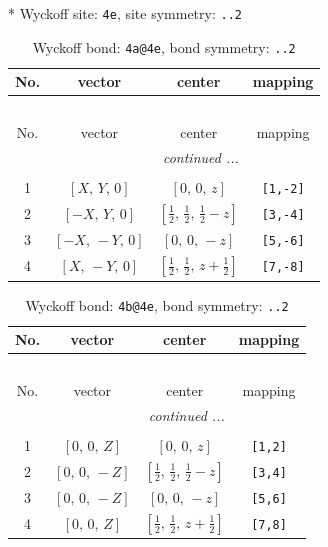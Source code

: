\documentclass[fleqn,8pt]{jsarticle}
\begin{document}
* Wyckoff site: {\tt 4e}, site symmetry: {\tt ..2}
\renewcommand{\arraystretch}{1.2}
\begin{longtable}{cccc}
\caption{Wyckoff bond: {\tt 4a@4e}, bond symmetry: {\tt ..2}}
 \\
 \hline \hline
No. & vector & center & mapping \\ \hline \endfirsthead

\multicolumn{3}{l}{\tablename\ \thetable{}} \\
 \hline \hline
No. & vector & center & mapping \\ \hline \endhead

 \hline \hline
\multicolumn{3}{r}{\footnotesize\it continued ...} \\ \endfoot

 \hline \hline
\multicolumn{3}{r}{} \\ \endlastfoot

1 & $\left[ X,\, Y,\, 0 \right]$ & $\left[ 0,\, 0,\, z \right]$ & {\tt [1,-2]} \\ \hline
2 & $\left[ - X,\, Y,\, 0 \right]$ & $\left[ \frac{1}{2},\, \frac{1}{2},\, \frac{1}{2} - z \right]$ & {\tt [3,-4]} \\ \hline
3 & $\left[ - X,\, - Y,\, 0 \right]$ & $\left[ 0,\, 0,\, - z \right]$ & {\tt [5,-6]} \\ \hline
4 & $\left[ X,\, - Y,\, 0 \right]$ & $\left[ \frac{1}{2},\, \frac{1}{2},\, z + \frac{1}{2} \right]$ & {\tt [7,-8]} \\
\end{longtable}
\renewcommand{\arraystretch}{1.2}
\begin{longtable}{cccc}
\caption{Wyckoff bond: {\tt 4b@4e}, bond symmetry: {\tt ..2}}
 \\
 \hline \hline
No. & vector & center & mapping \\ \hline \endfirsthead

\multicolumn{3}{l}{\tablename\ \thetable{}} \\
 \hline \hline
No. & vector & center & mapping \\ \hline \endhead

 \hline \hline
\multicolumn{3}{r}{\footnotesize\it continued ...} \\ \endfoot

 \hline \hline
\multicolumn{3}{r}{} \\ \endlastfoot

1 & $\left[ 0,\, 0,\, Z \right]$ & $\left[ 0,\, 0,\, z \right]$ & {\tt [1,2]} \\ \hline
2 & $\left[ 0,\, 0,\, - Z \right]$ & $\left[ \frac{1}{2},\, \frac{1}{2},\, \frac{1}{2} - z \right]$ & {\tt [3,4]} \\ \hline
3 & $\left[ 0,\, 0,\, - Z \right]$ & $\left[ 0,\, 0,\, - z \right]$ & {\tt [5,6]} \\ \hline
4 & $\left[ 0,\, 0,\, Z \right]$ & $\left[ \frac{1}{2},\, \frac{1}{2},\, z + \frac{1}{2} \right]$ & {\tt [7,8]} \\
\end{longtable}
\end{document}
